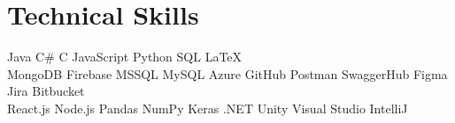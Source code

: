 \documentclass[]{deedy-resume-openfont}
\begin{document}

\section{Technical Skills}

Java \textbullet{}   C\# \textbullet{} C \textbullet{} JavaScript \textbullet{}
Python \textbullet{} SQL \textbullet{} LaTeX \\ 

MongoDB \textbullet{} Firebase \textbullet{} MSSQL \textbullet{} MySQL \textbullet{} Azure \textbullet{} GitHub  
\textbullet{} Postman \textbullet{} SwaggerHub \textbullet{} Figma  \textbullet{} Jira
\textbullet{} Bitbucket\\
React.js \textbullet{} Node.js \textbullet{} Pandas \textbullet{} NumPy \textbullet{}
Keras \textbullet{} .NET \textbullet{} Unity \textbullet{} Visual Studio \textbullet{} IntelliJ
\sectionsep\


\hfill
\end{document}
